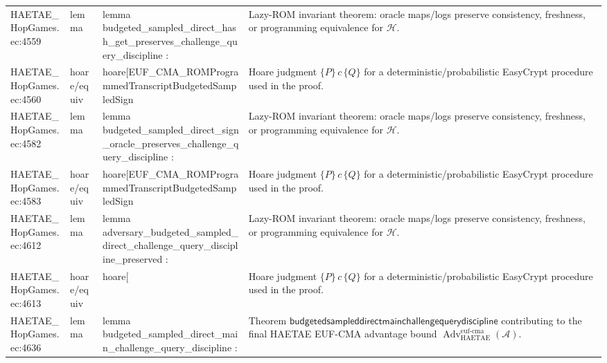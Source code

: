 \documentclass[10pt]{article}
\newcommand{\Adv}{\operatorname{Adv}}
\begin{document}
\begin{longtable}{L{0.11\textwidth}L{0.055\textwidth}L{0.385\textwidth}L{0.41\textwidth}}
HAETAE\_\allowbreak{}HopGames.\allowbreak{}ec:\allowbreak{}4559 & lemma & {\ttfamily\scriptsize lemma budgeted\_\allowbreak{}sampled\_\allowbreak{}direct\_\allowbreak{}hash\_\allowbreak{}get\_\allowbreak{}preserves\_\allowbreak{}challenge\_\allowbreak{}query\_\allowbreak{}discipline :} & Lazy-ROM invariant theorem: oracle maps/logs preserve consistency, freshness, or programming equivalence for $\mathcal H$. \\
HAETAE\_\allowbreak{}HopGames.\allowbreak{}ec:\allowbreak{}4560 & hoare/equiv & {\ttfamily\scriptsize hoare[EUF\_\allowbreak{}CMA\_\allowbreak{}ROMProgrammedTranscriptBudgetedSampledSign} & Hoare judgment $\{P\}\,c\,\{Q\}$ for a deterministic/probabilistic EasyCrypt procedure used in the proof. \\
HAETAE\_\allowbreak{}HopGames.\allowbreak{}ec:\allowbreak{}4582 & lemma & {\ttfamily\scriptsize lemma budgeted\_\allowbreak{}sampled\_\allowbreak{}direct\_\allowbreak{}sign\_\allowbreak{}oracle\_\allowbreak{}preserves\_\allowbreak{}challenge\_\allowbreak{}query\_\allowbreak{}discipline :} & Lazy-ROM invariant theorem: oracle maps/logs preserve consistency, freshness, or programming equivalence for $\mathcal H$. \\
HAETAE\_\allowbreak{}HopGames.\allowbreak{}ec:\allowbreak{}4583 & hoare/equiv & {\ttfamily\scriptsize hoare[EUF\_\allowbreak{}CMA\_\allowbreak{}ROMProgrammedTranscriptBudgetedSampledSign} & Hoare judgment $\{P\}\,c\,\{Q\}$ for a deterministic/probabilistic EasyCrypt procedure used in the proof. \\
HAETAE\_\allowbreak{}HopGames.\allowbreak{}ec:\allowbreak{}4612 & lemma & {\ttfamily\scriptsize lemma adversary\_\allowbreak{}budgeted\_\allowbreak{}sampled\_\allowbreak{}direct\_\allowbreak{}challenge\_\allowbreak{}query\_\allowbreak{}discipline\_\allowbreak{}preserved :} & Lazy-ROM invariant theorem: oracle maps/logs preserve consistency, freshness, or programming equivalence for $\mathcal H$. \\
HAETAE\_\allowbreak{}HopGames.\allowbreak{}ec:\allowbreak{}4613 & hoare/equiv & {\ttfamily\scriptsize hoare[} & Hoare judgment $\{P\}\,c\,\{Q\}$ for a deterministic/probabilistic EasyCrypt procedure used in the proof. \\
HAETAE\_\allowbreak{}HopGames.\allowbreak{}ec:\allowbreak{}4636 & lemma & {\ttfamily\scriptsize lemma budgeted\_\allowbreak{}sampled\_\allowbreak{}direct\_\allowbreak{}main\_\allowbreak{}challenge\_\allowbreak{}query\_\allowbreak{}discipline :} & Theorem $\mathsf{budgetedsampleddirectmainchallengequerydiscipline}$ contributing to the final HAETAE EUF-CMA advantage bound $\Adv_{\mathrm{HAETAE}}^{\mathrm{euf\mbox{-}cma}}(\mathcal A)$. \\

\end{longtable}
\end{document}

